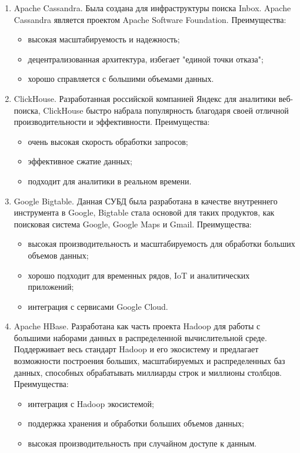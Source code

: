 \documentclass[14pt, russian]{scrartcl}
\begin{document}
\begin{enumerate}
	\item{Apache Cassandra. Была создана для инфраструктуры поиска Inbox. Apache Cassandra является проектом Apache Software Foundation. Преимущества:
	      \begin{itemize}
		      \item высокая масштабируемость и надежность;
		      \item децентрализованная архитектура, избегает "единой точки отказа";
		      \item хорошо справляется с большими объемами данных.
	      \end{itemize}}
	\item{ClickHouse. Разработанная российской компанией Яндекс для аналитики веб-поиска, ClickHouse быстро набрала популярность благодаря своей отличной производительности и эффективности. Преимущества:
	      \begin{itemize}
		      \item очень высокая скорость обработки запросов;
		      \item эффективное сжатие данных;
		      \item подходит для аналитики в реальном времени.
	      \end{itemize}}

	\item{Google Bigtable. Данная СУБД была разработана в качестве внутреннего инструмента в Google, Bigtable стала основой для таких продуктов, как поисковая система Google, Google Maps и Gmail. Преимущества:
	      \begin{itemize}
		      \item высокая производительность и масштабируемость для обработки больших объемов данных;
		      \item хорошо подходит для временных рядов, IoT и аналитических приложений;
		      \item интеграция с сервисами Google Cloud.
	      \end{itemize}
	      }
	\item{Apache HBase. Разработана как часть проекта Hadoop для работы с большими наборами данных в распределенной вычислительной среде. Поддерживает весь стандарт Hadoop и его экосистему и предлагает возможности построения больших, масштабируемых и распределенных баз данных, способных обрабатывать миллиарды строк и миллионы столбцов. Преимущества:
	      \begin{itemize}
		      \item интеграция с Hadoop экосистемой;
		      \item поддержка хранения и обработки больших объемов данных;
		      \item высокая производительность при случайном доступе к данным.
	      \end{itemize}
	      }



\end{enumerate}
\end{document}
